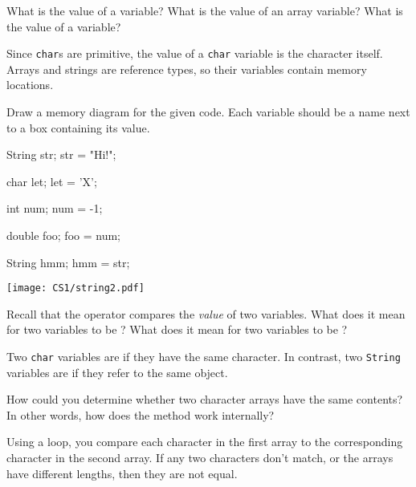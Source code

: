 \Q What is the value of a  variable?
What is the value of an array variable?
What is the value of a  variable?

\begin{answer}
Since {\tt char}s are primitive, the value of a {\tt char} variable is the character itself.
Arrays and strings are reference types, so their variables contain memory locations.
\end{answer}


\Q Draw a memory diagram for the given code.
Each variable should be a name next to a box containing its value.

\vspace{1ex}
\begin{javalst}
String str;
str = "Hi!";

char let;
let = 'X';

int num;
num = -1;

double foo;
foo = num;

String hmm;
hmm = str;
\end{javalst}

\vspace{-3.25in}
\begin{answer}[3.1in]
\hspace{2.2in}
\texttt{[image: CS1/string2.pdf]}
\end{answer}


\Q Recall that the \java{==} operator compares the \emph{value} of two variables.
What does it mean for two  variables to be \java{==}?
What does it mean for two  variables to be \java{==}?

\begin{answer}
Two {\tt char} variables are \java{==} if they have the same character.
In contrast, two {\tt String} variables are \java{==} if they refer to the same  object.
\end{answer}


\Q How could you determine whether two character arrays have the same contents?
In other words, how does the  method work internally?

\begin{answer}
Using a loop, you compare each character in the first array to the corresponding character in the second array. If any two characters don't match, or the arrays have different lengths, then they are not equal.
\end{answer}
